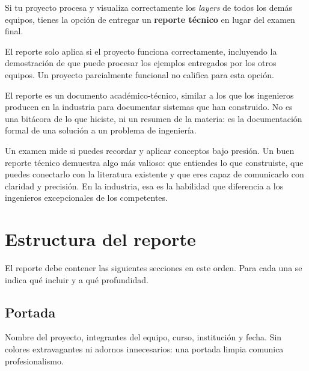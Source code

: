 \documentclass[12pt, oneside]{article}
\begin{document}
Si tu proyecto procesa y visualiza correctamente los \textit{layers}
de todos los demás equipos, tienes la opción de entregar un
\textbf{reporte técnico} en lugar del examen final.

\begin{recuerda}
  El reporte solo aplica si el proyecto funciona correctamente,
  incluyendo la demostración de que puede procesar los ejemplos
  entregados por los otros equipos.  Un proyecto parcialmente
  funcional no califica para esta opción.
\end{recuerda}

El reporte es un documento académico-técnico, similar a los que los
ingenieros producen en la industria para documentar sistemas que han
construido.  No es una bitácora de lo que hiciste, ni un resumen de
la materia: es la documentación formal de una solución a un problema
de ingeniería.

\begin{consejo}
  Un examen mide si puedes recordar y aplicar conceptos bajo presión.
  Un buen reporte técnico demuestra algo más valioso: que entiendes
  lo que construiste, que puedes conectarlo con la literatura
  existente y que eres capaz de comunicarlo con claridad y precisión.
  En la industria, esa es la habilidad que diferencia a los ingenieros
  excepcionales de los competentes.
\end{consejo}

\section{Estructura del reporte}

El reporte debe contener las siguientes secciones en este orden.
Para cada una se indica qué incluir y a qué profundidad.

\subsection{Portada}

Nombre del proyecto, integrantes del equipo, curso, institución y
fecha.  Sin colores extravagantes ni adornos innecesarios: una portada
limpia comunica profesionalismo.
\end{document}
